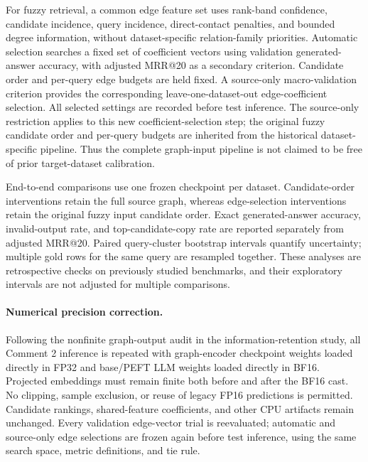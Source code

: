 For fuzzy retrieval, a common edge feature set uses rank-band confidence,
candidate incidence, query incidence, direct-contact penalties, and bounded
degree information, without dataset-specific relation-family priorities.
Automatic selection searches a fixed set of coefficient vectors using validation
generated-answer accuracy, with adjusted MRR@20 as a secondary criterion. Candidate
order and per-query edge budgets are held fixed. A source-only macro-validation
criterion provides the corresponding leave-one-dataset-out edge-coefficient
selection. All selected settings are recorded before test inference.
The source-only restriction applies to this new coefficient-selection step;
the original fuzzy candidate order and per-query budgets are inherited from the
historical dataset-specific pipeline. Thus the complete graph-input pipeline is
not claimed to be free of prior target-dataset calibration.

End-to-end comparisons use one frozen checkpoint per dataset. Candidate-order
interventions retain the full source graph, whereas edge-selection interventions
retain the original fuzzy input candidate order. Exact generated-answer accuracy,
invalid-output rate, and top-candidate-copy rate are reported separately from
adjusted MRR@20. Paired query-cluster bootstrap intervals quantify uncertainty;
multiple gold rows for the same query are resampled together. These analyses are
retrospective checks on previously studied benchmarks, and their exploratory
intervals are not adjusted for multiple comparisons.

\paragraph{Numerical precision correction.}
Following the nonfinite graph-output audit in the information-retention study,
all Comment 2 inference is repeated with graph-encoder checkpoint weights loaded
directly in FP32 and base/PEFT LLM weights loaded directly in BF16. Projected
embeddings must remain finite both before and after the BF16 cast. No clipping,
sample exclusion, or reuse of legacy FP16 predictions is permitted. Candidate
rankings, shared-feature coefficients, and other CPU artifacts remain unchanged.
Every validation edge-vector trial is reevaluated; automatic and source-only
edge selections are frozen again before test inference, using the same search
space, metric definitions, and tie rule.

